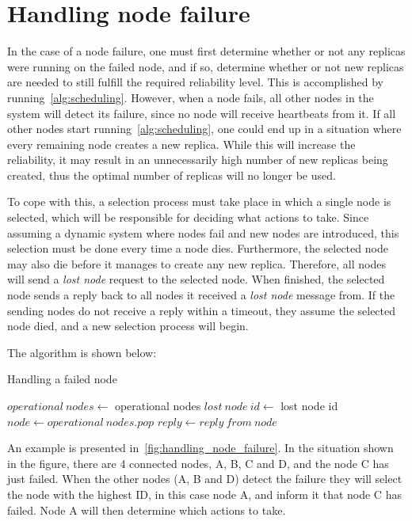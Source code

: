 \documentclass{cslthse-msc}
\begin{document}
\section{Handling node failure} \label{sec:design_handling_failure}
In the case of a node failure, one must first determine whether or not any replicas were running on the failed node, and if so, determine whether or not new replicas are needed to still fulfill the required reliability level. This is accomplished by running~\cref{alg:scheduling}. However, when a node fails, all other nodes in the system will detect its failure, since no node will receive heartbeats from it. If all other nodes start running~\cref{alg:scheduling}, one could end up in a situation where every remaining node creates a new replica. While this will increase the reliability, it may result in an unnecessarily high number of new replicas being created, thus the optimal number of replicas will no longer be used.

To cope with this, a selection process must take place in which a single node is selected, which will be responsible for deciding what actions to take. Since assuming a dynamic system where nodes fail and new nodes are introduced, this selection must be done every time a node dies. Furthermore, the selected node may also die before it manages to create any new replica. Therefore, all nodes will send a \emph{lost node} request to the selected node. When finished, the selected node sends a reply back to all nodes it received a \emph{lost node} message from. If the sending nodes do not receive a reply within a timeout, they assume the selected node died, and a new selection process will begin.

The algorithm is shown below:

\begin{algorithm}[!h]
	\caption{Handling a failed node} \label{alg:node_failure}
	\begin{algorithmic}[1]
	\State $operational\ nodes\gets $ operational nodes
	\State $lost\ node\ id\gets $ lost node id
	\State
	\Do
		\State $node\gets operational\ nodes.pop$
		\State
		\State $reply\gets reply\ from\ node$
	\end{algorithmic}
\end{algorithm}

An example is presented in~\cref{fig:handling_node_failure}. In the situation shown in the figure, there are 4 connected nodes, A, B, C and D, and the node C has just failed. When the other nodes (A, B and D) detect the failure they will select the node with the highest ID, in this case node A, and inform it that node C has failed. Node A will then determine which actions to take.
\end{document}
